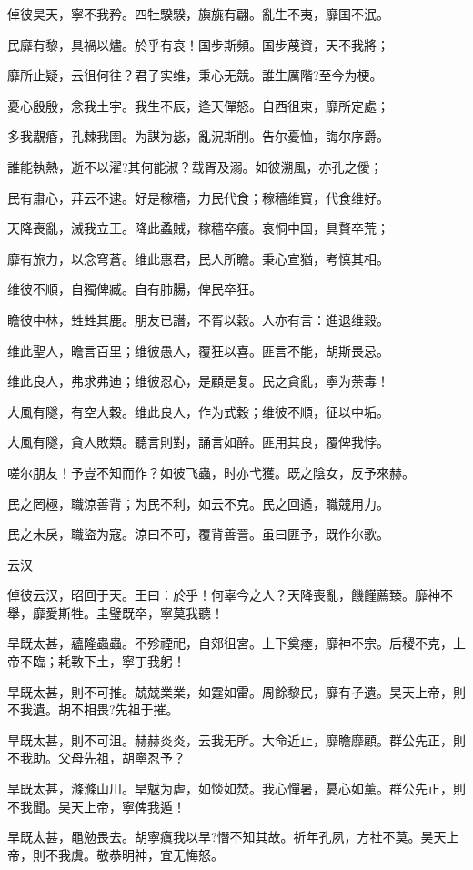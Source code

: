 倬彼昊天，寧不我矜。四牡騤騤，旟旐有翩。亂生不夷，靡国不泯。

民靡有黎，具禍以燼。於乎有哀！国步斯頻。国步蔑資，天不我將；

靡所止疑，云徂何往？君子实维，秉心无競。誰生厲階?至今为梗。

憂心殷殷，念我土宇。我生不辰，逢天僤怒。自西徂東，靡所定處；

多我覯痻，孔棘我圉。为謀为毖，亂況斯削。告尔憂恤，誨尔序爵。

誰能執熱，逝不以濯?其何能淑？载胥及溺。如彼溯風，亦孔之僾；

民有肅心，荓云不逮。好是稼穡，力民代食；稼穡维寶，代食维好。

天降喪亂，滅我立王。降此蟊賊，稼穡卒癢。哀恫中国，具贅卒荒；

靡有旅力，以念穹蒼。维此惠君，民人所瞻。秉心宣猶，考慎其相。

维彼不順，自獨俾臧。自有肺腸，俾民卒狂。

瞻彼中林，甡甡其鹿。朋友已譖，不胥以穀。人亦有言：進退维穀。

维此聖人，瞻言百里；维彼愚人，覆狂以喜。匪言不能，胡斯畏忌。

维此良人，弗求弗迪；维彼忍心，是顧是复。民之貪亂，寧为荼毒！

大風有隧，有空大穀。维此良人，作为式穀；维彼不順，征以中垢。

大風有隧，貪人敗類。聽言則對，誦言如醉。匪用其良，覆俾我悖。

嗟尔朋友！予豈不知而作？如彼飞蟲，时亦弋獲。既之陰女，反予來赫。

民之罔極，職涼善背；为民不利，如云不克。民之回遹，職競用力。

民之未戾，職盜为寇。涼曰不可，覆背善詈。虽曰匪予，既作尔歌。

云汉

倬彼云汉，昭回于天。王曰：於乎！何辜今之人？天降喪亂，饑饉薦臻。靡神不舉，靡愛斯牲。圭璧既卒，寧莫我聽！

旱既太甚，蘊隆蟲蟲。不殄禋祀，自郊徂宮。上下奠瘞，靡神不宗。后稷不克，上帝不臨；耗斁下土，寧丁我躬！

旱既太甚，則不可推。兢兢業業，如霆如雷。周餘黎民，靡有孑遺。昊天上帝，則不我遺。胡不相畏?先祖于摧。

旱既太甚，則不可沮。赫赫炎炎，云我无所。大命近止，靡瞻靡顧。群公先正，則不我助。父母先祖，胡寧忍予？

旱既太甚，滌滌山川。旱魃为虐，如惔如焚。我心憚暑，憂心如薰。群公先正，則不我聞。昊天上帝，寧俾我遁！

旱既太甚，黽勉畏去。胡寧瘨我以旱?憯不知其故。祈年孔夙，方社不莫。昊天上帝，則不我虞。敬恭明神，宜无悔怒。

